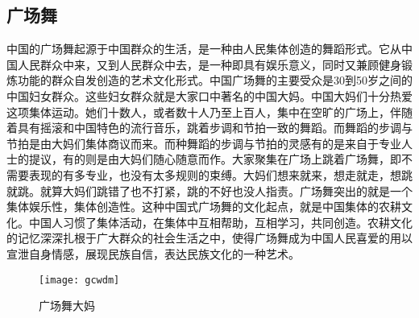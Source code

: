 \subsection{广场舞}

中国的广场舞起源于中国群众的生活，是一种由人民集体创造的舞蹈形式。它从中国人民群众中来，又到人民群众中去，是一种即具有娱乐意义，同时又兼顾健身锻炼功能的群众自发创造的艺术文化形式。中国广场舞的主要受众是30到50岁之间的中国妇女群众。这些妇女群众就是大家口中著名的中国大妈。中国大妈们十分热爱这项集体运动。她们十数人，或者数十人乃至上百人，集中在空旷的广场上，伴随着具有摇滚和中国特色的流行音乐，跳着步调和节拍一致的舞蹈。而舞蹈的步调与节拍是由大妈们集体商议而来。而种舞蹈的步调与节拍的灵感有的是来自于专业人士的提议，有的则是由大妈们随心随意而作。大家聚集在广场上跳着广场舞，即不需要表现的有多专业，也没有太多规则的束缚。大妈们想来就来，想走就走，想跳就跳。就算大妈们跳错了也不打紧，跳的不好也没人指责。广场舞突出的就是一个集体娱乐性，集体创造性。这种中国式广场舞的文化起点，就是中国集体的农耕文化。中国人习惯了集体活动，在集体中互相帮助，互相学习，共同创造。农耕文化的记忆深深扎根于广大群众的社会生活之中，使得广场舞成为中国人民喜爱的用以宣泄自身情感，展现民族自信，表达民族文化的一种艺术。
\begin{figure}[htb]
    \centering
  \texttt{[image: gcwdm]}    
\caption{广场舞大妈}
\end{figure}